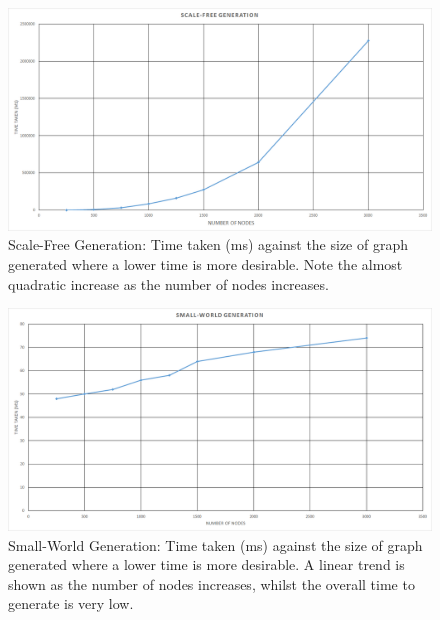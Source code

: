 \documentclass[]{report}
\begin{document}
\begin{figure}
\begin{center}
\includegraphics[width=\textwidth]{scale-free-gen.png}
\end{center}
\caption{Scale-Free Generation: Time taken (ms) against the size of graph generated where a lower time is more desirable. Note the almost quadratic increase as the number of nodes increases.}
\label{img:SF-gen}
\end{figure}

\begin{figure}
\begin{center}
\includegraphics[width=\textwidth]{small-world-gen.png}
\end{center}
\caption{Small-World Generation: Time taken (ms) against the size of graph generated where a lower time is more desirable. A linear trend is shown as the number of nodes increases, whilst the overall time to generate is very low.}
\label{img:SW-gen}
\end{figure}
\end{document}
